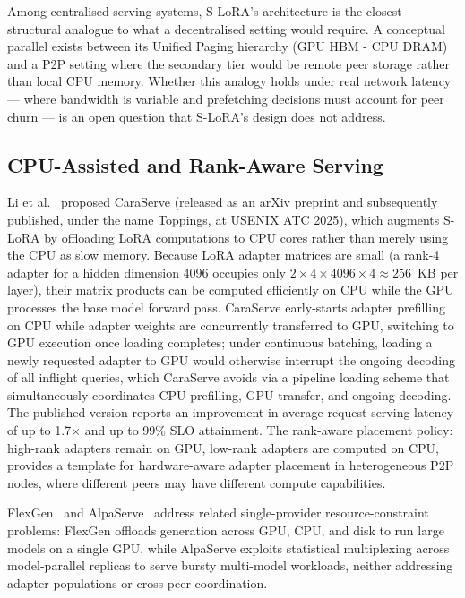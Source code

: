 Among centralised serving systems, S-LoRA's architecture is the closest structural analogue to what a decentralised setting would require. A conceptual parallel exists between its Unified Paging hierarchy (GPU HBM - CPU DRAM) and a P2P setting where the secondary tier would be remote peer storage rather than local CPU memory. Whether this analogy holds under real network latency — where bandwidth is variable and prefetching decisions must account for peer churn — is an open question that S-LoRA's design does not address.

\subsection{CPU-Assisted and Rank-Aware Serving}
\label{sec:inference_systems:cpu}

Li et al.~\cite{Li2024CaraServe} proposed CaraServe (released as an arXiv preprint and
subsequently published, under the name Toppings, at USENIX ATC 2025), which augments
S-LoRA by offloading LoRA computations to CPU cores rather than merely using the CPU as
slow memory. Because LoRA adapter matrices are small (a rank-4 adapter for a hidden
dimension 4096 occupies only $2 \times 4 \times 4096 \times 4 \approx 256$~KB per
layer), their matrix products can be computed efficiently on CPU while the GPU
processes the base model forward pass. CaraServe early-starts adapter prefilling on CPU
while adapter weights are concurrently transferred to GPU, switching to GPU execution
once loading completes; under continuous batching, loading a newly requested adapter to
GPU would otherwise interrupt the ongoing decoding of all inflight queries, which
CaraServe avoids via a pipeline loading scheme that simultaneously coordinates CPU
prefilling, GPU transfer, and ongoing decoding. The published version reports an
improvement in average request serving latency of up to 1.7$\times$ and up to 99\% SLO
attainment. The rank-aware placement policy: high-rank adapters remain on GPU,
low-rank adapters are computed on CPU, provides a template for hardware-aware adapter
placement in heterogeneous P2P nodes, where different peers may have different compute
capabilities.

FlexGen~\cite{ShengFlexGen2023} and AlpaServe~\cite{LiAlpaServe2023} address related single-provider resource-constraint problems: FlexGen offloads generation across GPU, CPU, and disk to run large models on a single GPU, while AlpaServe exploits statistical multiplexing across model-parallel replicas to serve bursty multi-model workloads, neither addressing adapter populations or cross-peer coordination.

